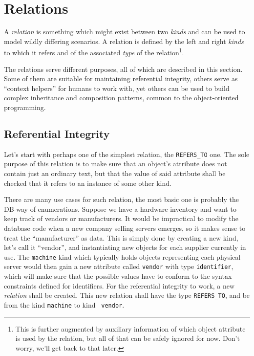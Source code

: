 \documentclass{article}
\begin{document}
\section{Relations}

A {\em relation} is something which might exist between two {\em kinds} and can be used to model wildly differing
scenarios.  A relation is defined by the left and right {\em kinds} to which it refers and of the associated {\em type}
of the relation\footnote{This is further augmented by auxiliary information of which object attribute is used by the
relation, but all of that can be safely ignored for now.  Don't worry, we'll get back to that later.}.

The relations serve different purposes, all of which are described in this section.  Some of them are suitable for
maintaining referential integrity, others serve as ``context helpers'' for humans to work with, yet others can be used
to build complex inheritance and composition patterns, common to the object-oriented programming.

\subsection{Referential Integrity}

Let's start with perhaps one of the simplest relation, the {\tt REFERS\_TO} one.  The sole purpose of this relation is
to make sure that an object's attribute does not contain just an ordinary text, but that the value of said attribute
shall be checked that it refers to an instance of some other kind.

There are many use cases for such relation, the most basic one is probably the DB-way of enumerations.  Suppose we have
a hardware inventory and want to keep track of vendors or manufacturers.  It would be impractical to modify the database
code when a new company selling servers emerges, so it makes sense to treat the ``manufacturer'' as data.  This is
simply done by creating a new kind, let's call it ``vendor'', and instantiating new objects for each supplier currently
in use.  The {\tt machine} kind which typically holds objects representing each physical server would then gain a new
attribute called {\tt vendor} with type {\tt identifier}, which will make sure that the possible values have to conform
to the syntax constraints defined for identifiers.  For the referential integrity to work, a new {\em relation} shall be
created.  This new relation shall have the type {\tt REFERS\_TO}, and be from the kind {\tt machine} to kind {\tt
vendor}.
\end{document}

